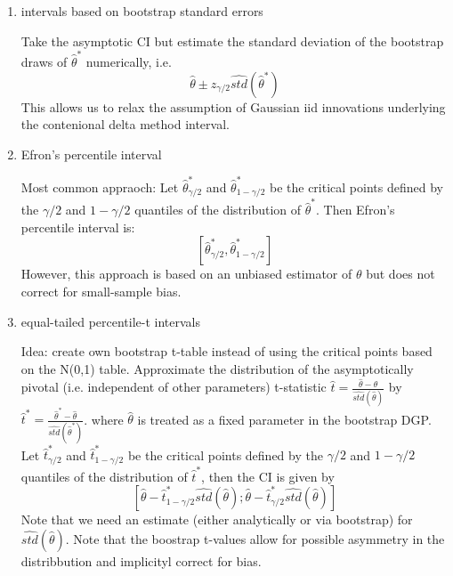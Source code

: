 \documentclass[a4paper]{scrartcl}
\begin{document}
\begin{enumerate}
              \begin{enumerate}
                  \item intervals based on bootstrap standard errors
                        \begin{solution}
                            Take the asymptotic CI but estimate the standard deviation of the bootstrap draws of $\hat{\theta}^\ast$ numerically, i.e.
                            $$\hat{\theta} \pm z_{\gamma/2} \widehat{std}(\hat{\theta}^\ast)$$
                            This allows us to relax the assumption of Gaussian iid innovations underlying the contenional delta method interval.
                        \end{solution}
                  \item Efron's percentile interval
                        \begin{solution}
                            Most common appraoch: Let $\hat{\theta}^\ast_{\gamma/2}$ and $\hat{\theta}^\ast_{1-\gamma/2}$ be the critical points defined by the $\gamma/2$ and $1-\gamma/2$ quantiles of the distribution of $\hat{\theta}^\ast$. Then Efron's percentile interval is:
                            $$[\hat{\theta}^\ast_{\gamma/2},\hat{\theta}^\ast_{1-\gamma/2}]$$ However, this approach is based on an unbiased estimator of $\theta$ but does not correct for small-sample bias.
                        \end{solution}
                  \item equal-tailed percentile-t intervals
                        \begin{solution}
                            Idea: create own bootstrap t-table instead of using the critical points based on the N(0,1) table. Approximate the distribution of the asymptotically pivotal (i.e. independent of other parameters) t-statistic $\hat{t}=\frac{\hat{\theta}-\theta}{\widehat{std}(\hat{\theta})}$ by $\hat{t}^\ast = \frac{\hat{\theta}^\ast-\hat{\theta}}{\widehat{std}(\hat{\theta}^\ast)}$. where $\hat{\theta}$ is treated as a fixed parameter in the bootstrap DGP. Let $\hat{t}^\ast_{\gamma/2}$ and $\hat{t}^\ast_{1-\gamma/2}$ be the critical points defined by the $\gamma/2$ and $1-\gamma/2$ quantiles of the distribution of $\hat{t}^\ast$, then the CI is given by
                            $$[\hat{\theta}-\hat{t}^\ast_{1-\gamma/2} \widehat{std}(\hat{\theta}); \hat{\theta}-\hat{t}^\ast_{\gamma/2} \widehat{std}(\hat{\theta})]$$ Note that we need an estimate (either analytically or via bootstrap) for $\widehat{std}(\hat{\theta})$. Note that the boostrap t-values allow for possible asymmetry in the distribbution and implicityl correct for bias.
                        \end{solution}
              \end{enumerate}
    \end{enumerate}
    \newpage
\fi
\end{document}
